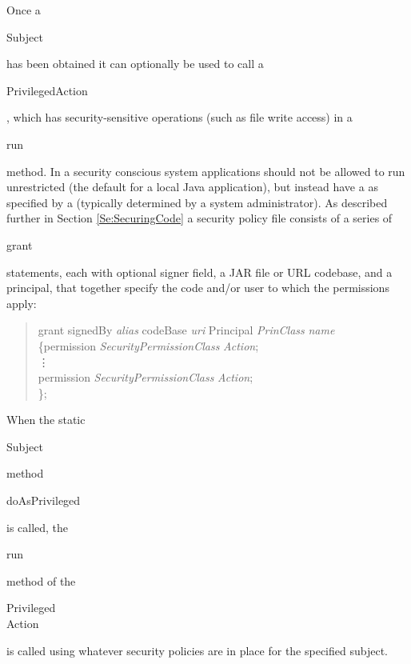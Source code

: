 Once a \begin{code}Subject\end{code} has been obtained it can optionally be used to
call a \begin{code}PrivilegedAction\end{code}, which has security-sensitive
operations (such as file write access) in a \begin{code}run\end{code} method.
In a security conscious system applications should not be allowed
to run unrestricted (the default for a local Java application), but instead
have a  as specified by a 
(typically determined by a system administrator).
As described further in Section \ref{Se:SecuringCode}
a security policy file consists of a series of \begin{code}grant\end{code}
statements, each with optional signer field, a JAR file or URL codebase,
and a principal, that together specify the code and/or user to which the permissions apply:
\begin{quote}\begin{code}
grant signedBy \emph{alias} codeBase \emph{uri} Principal \emph{PrinClass} \emph{name} \\
\{\dbind permission \emph{SecurityPermissionClass} \emph{Action}; \\
\trind \vdots \\
\trind permission \emph{SecurityPermissionClass} \emph{Action}; \\
\};
\end{code}\end{quote}
When the static \begin{code}Subject\end{code} method
\begin{code}doAsPrivileged\end{code} is called, the \begin{code}run\end{code}
method of the \begin{code}Privileged\\Action\end{code} is called using
whatever security policies are in place for the specified subject.

